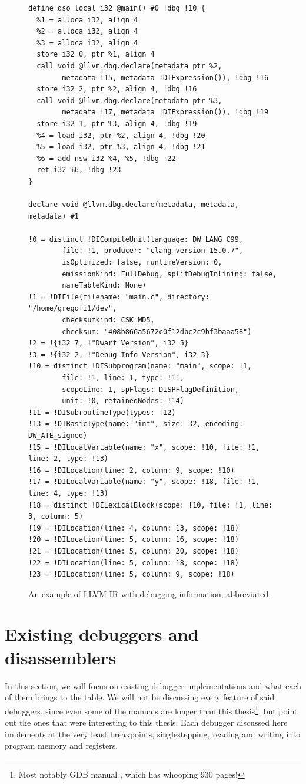 \begin{figure}
    \begin{verbatim}
define dso_local i32 @main() #0 !dbg !10 {
  %1 = alloca i32, align 4
  %2 = alloca i32, align 4
  %3 = alloca i32, align 4
  store i32 0, ptr %1, align 4
  call void @llvm.dbg.declare(metadata ptr %2,
        metadata !15, metadata !DIExpression()), !dbg !16
  store i32 2, ptr %2, align 4, !dbg !16
  call void @llvm.dbg.declare(metadata ptr %3,
        metadata !17, metadata !DIExpression()), !dbg !19
  store i32 1, ptr %3, align 4, !dbg !19
  %4 = load i32, ptr %2, align 4, !dbg !20
  %5 = load i32, ptr %3, align 4, !dbg !21
  %6 = add nsw i32 %4, %5, !dbg !22
  ret i32 %6, !dbg !23
}

declare void @llvm.dbg.declare(metadata, metadata, metadata) #1

!0 = distinct !DICompileUnit(language: DW_LANG_C99, 
        file: !1, producer: "clang version 15.0.7", 
        isOptimized: false, runtimeVersion: 0, 
        emissionKind: FullDebug, splitDebugInlining: false, 
        nameTableKind: None)
!1 = !DIFile(filename: "main.c", directory: "/home/gregofi1/dev",
        checksumkind: CSK_MD5,
        checksum: "408b866a5672c0f12dbc2c9bf3baaa58")
!2 = !{i32 7, !"Dwarf Version", i32 5}
!3 = !{i32 2, !"Debug Info Version", i32 3}
!10 = distinct !DISubprogram(name: "main", scope: !1,
        file: !1, line: 1, type: !11,
        scopeLine: 1, spFlags: DISPFlagDefinition,
        unit: !0, retainedNodes: !14)
!11 = !DISubroutineType(types: !12)
!13 = !DIBasicType(name: "int", size: 32, encoding: DW_ATE_signed)
!15 = !DILocalVariable(name: "x", scope: !10, file: !1, line: 2, type: !13)
!16 = !DILocation(line: 2, column: 9, scope: !10)
!17 = !DILocalVariable(name: "y", scope: !18, file: !1, line: 4, type: !13)
!18 = distinct !DILexicalBlock(scope: !10, file: !1, line: 3, column: 5)
!19 = !DILocation(line: 4, column: 13, scope: !18)
!20 = !DILocation(line: 5, column: 16, scope: !18)
!21 = !DILocation(line: 5, column: 20, scope: !18)
!22 = !DILocation(line: 5, column: 18, scope: !18)
!23 = !DILocation(line: 5, column: 9, scope: !18)
    \end{verbatim}
    \caption{An example of LLVM IR with debugging information, abbreviated.}
    \label{fig:llvm-ir-debug}
\end{figure}

\section{Existing debuggers and disassemblers}
In this section, we will focus on existing debugger implementations and what
each of them brings to the table. We will not be discussing every feature of
said debuggers, since even some of the manuals are longer than this
thesis\footnote{Most notably GDB manual \cite{gdb-manual}, which has whooping
930 pages!}, but point out the ones that were interesting to this thesis.
Each debugger discussed here implements at the very least breakpoints,
singlestepping, reading and writing into program memory and registers.

